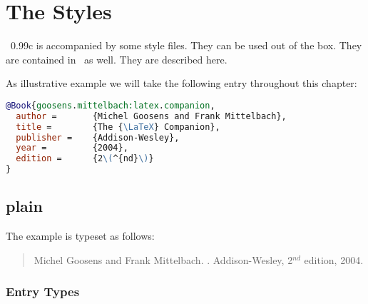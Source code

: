 
\chapter{The Styles}

\BibTeX~0.99c is accompanied by some
style files. They can be used out of the box. They are contained in
\ExBib\ as well. They are described here.

\def\MACRO#1#2{\texttt{#1} $\hookrightarrow$ \texttt{#2}\\}%
\def\Entry#1{\texttt{#1}}%
\def\Field#1{\texttt{#1}}%
\makeatletter
\newenvironment{BstSample}{%
  \begingroup
  \let\bib@heading\relax
  \begin{quotation}
}{
  \end{quotation}
  \endgroup
}%
\makeatother

As illustrative example we will take the following entry throughout
this chapter:

\begin{lstlisting}[language=BibTeX]
@Book{goosens.mittelbach:latex.companion,
  author =       {Michel Goosens and Frank Mittelbach},
  title =        {The {\LaTeX} Companion},
  publisher =    {Addison-Wesley},
  year =         {2004},
  edition =      {2\(^{nd}\)}
}
\end{lstlisting}

\section{plain}

\INCOMPLETE

The example is typeset as follows:
\begin{BstSample}
\begin{thebibliography}{10}

Michel Goosens and Frank Mittelbach.
.
\newblock Addison-Wesley, 2\(^{nd}\) edition, 2004.

\end{thebibliography}
\end{BstSample}

\subsection*{Entry Types}


